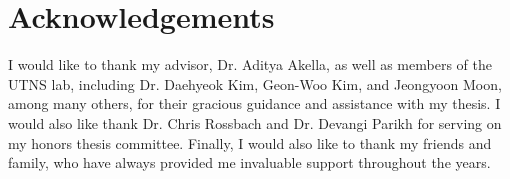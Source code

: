 \section{Acknowledgements}
I would like to thank my advisor, Dr. Aditya Akella, as well as members of the UTNS lab, including Dr. Daehyeok Kim, Geon-Woo Kim, and Jeongyoon Moon, among many others, for their gracious guidance and assistance with my thesis. I would also like thank Dr. Chris Rossbach and Dr. Devangi Parikh for serving on my honors thesis committee. Finally, I would also like to thank my friends and family, who have always provided me invaluable support throughout the years. 